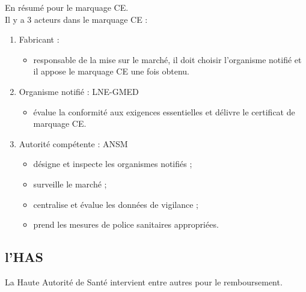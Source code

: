 \documentclass[a4paper,11pt]{article}
\begin{document}
\begin{sloppypar}
En résumé pour le marquage CE.\\
Il y a 3 acteurs dans le marquage CE :
\begin{enumerate}
 \item Fabricant :
 \begin{itemize}
  \item responsable de la mise sur le marché, il doit choisir l'organisme notifié et il appose le marquage CE une fois obtenu.
 \end{itemize}
\item Organisme notifié : LNE-GMED
\begin{itemize}
 \item évalue la conformité aux exigences essentielles et délivre le certificat de marquage CE.
\end{itemize}
\item Autorité compétente : ANSM
\begin{itemize}
 \item désigne et inspecte les organismes notifiés ;
 \item surveille le marché ;
 \item centralise et évalue les données de vigilance ;
 \item prend les mesures de police sanitaires appropriées.
\end{itemize}
\end{enumerate}

\subsection{l'HAS}
La Haute Autorité de Santé intervient entre autres pour le remboursement.\\


\end{sloppypar}
\end{document}
